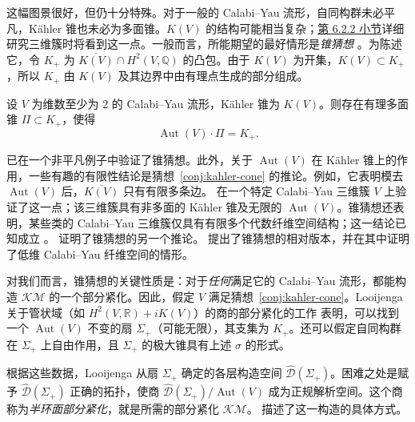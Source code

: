 这幅图景很好，但仍十分特殊。对于一般的 Calabi--Yau 流形，自同构群未必平凡，Kähler 锥也未必为多面锥。$K(V)$ 的结构可能相当复杂；\hyperref[subsec:threefold-kahler-moduli]{第 6.2.2 小节}详细研究三维簇时将看到这一点。一般而言，所能期望的最好情形是\emph{锥猜想} 。为陈述它，令 $K_+$ 为 $\overline{K(V)}\cap H^2(V,\mathbb Q)$ 的凸包。由于 $K(V)$ 为开集，$K(V)\subset K_+$，所以 $K_+$ 由 $K(V)$ 及其边界中由有理点生成的部分组成。
\begin{conjecture}\label{conj:kahler-cone}
设 $V$ 为维数至少为 $2$ 的 Calabi--Yau 流形，Kähler 锥为 $K(V)$。则存在有理多面锥 $\Pi\subset K_+$，使得
\[
\operatorname{Aut}(V)\cdot\Pi=K_+.
\]
\end{conjecture}
 已在一个非平凡例子中验证了锥猜想。此外，关于 $\operatorname{Aut}(V)$ 在 Kähler 锥上的作用，一些有趣的有限性结论是猜想~\ref{conj:kahler-cone} 的推论。例如，它表明模去 $\operatorname{Aut}(V)$ 后，$\overline{K(V)}$ 只有有限多条边。 在一个特定 Calabi--Yau 三维簇 $V$ 上验证了这一点；该三维簇具有非多面的 Kähler 锥及无限的 $\operatorname{Aut}(V)$。锥猜想还表明，某些类的 Calabi--Yau 三维簇仅具有有限多个代数纤维空间结构；这一结论已知成立 。 证明了锥猜想的另一个推论。 提出了锥猜想的相对版本，并在其中证明了低维 Calabi--Yau 纤维空间的情形。

对我们而言，锥猜想的关键性质是：对于\emph{任何}满足它的 Calabi--Yau 流形，都能构造 $\mathcal{KM}$ 的一个部分紧化。因此，假定 $V$ 满足猜想~\ref{conj:kahler-cone}。Looijenga 关于管状域（如 $H^2(V,\mathbb R)+iK(V)$）的商的部分紧化的工作  表明，可以找到一个 $\operatorname{Aut}(V)$ 不变的扇 $\Sigma_+$（可能无限），其支集为 $K_+$。还可以假定自同构群在 $\Sigma_+$ 上自由作用，且 $\Sigma_+$ 的极大锥具有上述 $\sigma$ 的形式。

根据这些数据，Looijenga 从扇 $\Sigma_+$ 确定的各层构造空间 $\widehat{\mathcal D}(\Sigma_+)$。困难之处是赋予 $\widehat{\mathcal D}(\Sigma_+)$ 正确的拓扑，使商 $\widehat{\mathcal D}(\Sigma_+)/\operatorname{Aut}(V)$ 成为正规解析空间。这个商称为\emph{半环面部分紧化}，就是所需的部分紧化 $\overline{\mathcal{KM}}$。 描述了这一构造的具体方式。

